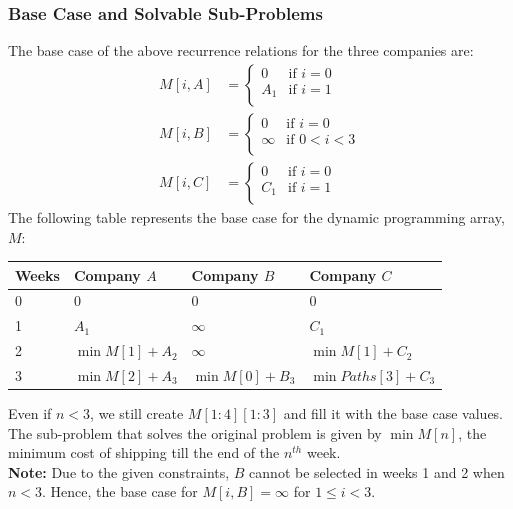 \documentclass[12pt]{report}
\begin{document}
    \subsubsection*{Base Case and Solvable Sub-Problems}
    The base case of the above recurrence relations for the three companies are:
    \begin{align}
        M[i, A] &= \begin{cases}
            0 & \text{if } i = 0 \\
            A_{1} & \text{if } i = 1 \\
        \end{cases} \\
        M[i, B] &= \begin{cases}
            0 & \text{if } i = 0 \\
            \infty & \text{if } 0 < i < 3 \\
        \end{cases} \\
        M[i, C] &= \begin{cases}
            0 & \text{if } i = 0 \\
            C_{1} & \text{if } i = 1 \\
        \end{cases}
    \end{align}
    The following table represents the base case for the dynamic programming array, $M$:

    \begin{center}
        \begin{tabular}{| m{12mm} | m{42mm} | m{42mm} | m{42mm} |}
        \hline
        Weeks & Company $A$ & Company $B$ & Company $C$ \\
        \hline \hline
        0 & 0 & 0 & 0 \\
        \hline
        1 & $A_{1}$ & $\infty$ & $C_{1}$ \\
        \hline
        2 & $\min{M[1]} + A_{2}$ & $\infty$ & $\min{M[1]} + C_{2}$ \\
        \hline
        3 & $\min{M[2]} + A_{3}$ & $\min{M[0]} + B_{3}$ & $\min{Paths[3]} + C_{3}$ \\
        \hline
        \end{tabular}
    \end{center}
    Even if $n < 3$, we still create $M[1:4][1:3]$ and fill it with the base case values. \\
    The sub-problem that solves the original problem is given by $\min{M[n]}$, the minimum cost of
    shipping till the end of the $n^{th}$ week.
    \vspace*{5pt} \\
    \textbf{Note:}
    Due to the given constraints, $B$ cannot be selected in weeks 1 and 2 when $n < 3$.
    Hence, the base case for $M[i, B] = \infty$ for $1 \le i < 3$.
\end{document}

